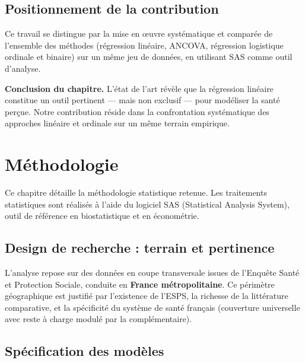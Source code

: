 \documentclass[11pt,a4paper]{memoirerecherche}
\begin{document}
\hypertarget{positionnement-de-la-contribution}{%
\subsection{Positionnement de la contribution}\label{positionnement-de-la-contribution}}

Ce travail se distingue par la mise en œuvre systématique et comparée de l'ensemble des méthodes (régression linéaire, ANCOVA, régression logistique ordinale et binaire) sur un même jeu de données, en utilisant SAS comme outil d'analyse.

\bigskip

\textbf{Conclusion du chapitre.} L'état de l'art révèle que la régression linéaire constitue un outil pertinent --- mais non exclusif --- pour modéliser la santé perçue. Notre contribution réside dans la confrontation systématique des approches linéaire et ordinale sur un même terrain empirique.

\hypertarget{chap-methodologie}{%
\section{Méthodologie}\label{chap-methodologie}}

Ce chapitre détaille la méthodologie statistique retenue. Les traitements statistiques sont réalisés à l'aide du logiciel SAS (Statistical Analysis System), outil de référence en biostatistique et en économétrie.

\hypertarget{design-de-recherche-terrain-et-pertinence}{%
\subsection{Design de recherche : terrain et pertinence}\label{design-de-recherche-terrain-et-pertinence}}

L'analyse repose sur des données en coupe transversale issues de l'Enquête Santé et Protection Sociale, conduite en \textbf{France métropolitaine}. Ce périmètre géographique est justifié par l'existence de l'ESPS, la richesse de la littérature comparative, et la spécificité du système de santé français (couverture universelle avec reste à charge modulé par la complémentaire).

\hypertarget{spuxe9cification-des-moduxe8les}{%
\subsection{Spécification des modèles}\label{spuxe9cification-des-moduxe8les}}
\end{document}
